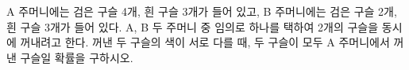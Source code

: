 A 주머니에는 검은 구슬 4개, 흰 구슬 3개가 들어 있고, B 주머니에는 검은 구슬 2개, 흰 구슬 3개가 들어 있다. A, B 두 주머니 중 임의로 하나를 택하여 2개의 구슬을 동시에 꺼내려고 한다. 꺼낸 두 구슬의 색이 서로 다를 때, 두 구슬이 모두 A 주머니에서 꺼낸 구슬일 확률을 구하시오.
